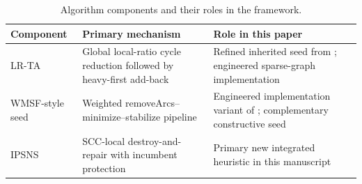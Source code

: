 \begin{table}[t]
\centering
\caption{Algorithm components and their roles in the framework.}
\label{tab:algorithm-components}
\begin{tabular}{>{\raggedright\arraybackslash}p{2.2cm} >{\raggedright\arraybackslash}p{3.8cm} >{\raggedright\arraybackslash}p{5.8cm}}
\toprule
Component & Primary mechanism & Role in this paper \\
\midrule
LR-TA & Global local-ratio cycle reduction followed by heavy-first add-back & Refined inherited seed from \cite{DF03,VahidiKoutis2024arxiv}; engineered sparse-graph implementation \\
WMSF-style seed & Weighted removeArcs--minimize--stabilize pipeline & Engineered implementation variant of \cite{CC25}; complementary constructive seed \\
IPSNS & SCC-local destroy-and-repair with incumbent protection & Primary new integrated heuristic in this manuscript \\
\bottomrule
\end{tabular}
\end{table}
